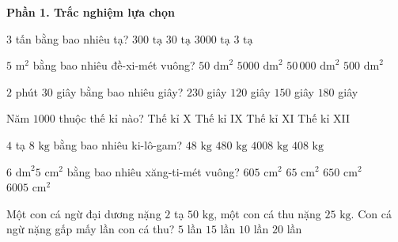 \textbf{Phần 1. Trắc nghiệm lựa chọn}

\begin{ex} %
$3$ tấn bằng bao nhiêu tạ?
\choice
{$300\text{ tạ}$}
{\True $30\text{ tạ}$}
{$3000\text{ tạ}$}
{$3\text{ tạ}$}
\end{ex}

\begin{ex} %
$5\text{ m}^2$ bằng bao nhiêu đề-xi-mét vuông?
\choice
{$50\text{ dm}^2$}
{$5000\text{ dm}^2$}
{$50\,000\text{ dm}^2$}
{\True $500\text{ dm}^2$}
\end{ex}

\begin{ex} %
$2$ phút $30$ giây bằng bao nhiêu giây?
\choice
{$230$ giây}
{$120$ giây}
{\True $150$ giây}
{$180$ giây}
\end{ex}

\begin{ex} %
Năm $1000$ thuộc thế kỉ nào?
\choice
{\True Thế kỉ X}
{Thế kỉ IX}
{Thế kỉ XI}
{Thế kỉ XII}
\end{ex}

\begin{ex} %
$4$ tạ $8\text{ kg}$ bằng bao nhiêu ki-lô-gam?
\choice
{$48\text{ kg}$}
{$480\text{ kg}$}
{$4008\text{ kg}$}
{\True $408\text{ kg}$}
\end{ex}

\begin{ex} %
$6\text{ dm}^2 5\text{ cm}^2$ bằng bao nhiêu xăng-ti-mét vuông?
\choice
{\True $605\text{ cm}^2$}
{$65\text{ cm}^2$}
{$650\text{ cm}^2$}
{$6005\text{ cm}^2$}
\end{ex}

\begin{ex} %
Một con cá ngừ đại dương nặng $2$ tạ $50\text{ kg}$, một con cá thu nặng $25\text{ kg}$. Con cá ngừ nặng gấp mấy lần con cá thu?
\choice
{$5$ lần}
{$15$ lần}
{\True $10$ lần}
{$20$ lần}
\end{ex}

